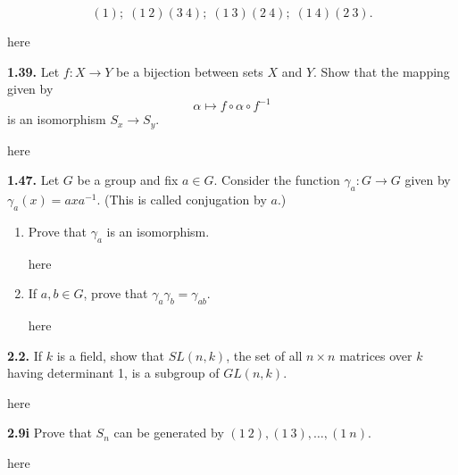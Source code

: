 \documentclass[12pt]{article}
\begin{document}
\[(1);\; (1\ 2)(3\ 4);\; (1\ 3)(2\ 4);\; (1\ 4)(2\ 3).\]


\bigskip

here

\vspace{1in}


\textbf{1.39.} Let $f : X\to Y$ be a bijection between sets $X$ and $Y$. Show that the mapping given by \[\alpha \mapsto f\circ\alpha\circ f^{-1}\] is an isomorphism $S_x\to S_y$.


\bigskip

here

\vspace{1in}

\textbf{1.47.} Let $G$ be a group and fix $a\in G$. Consider the function $\gamma_a: G\to G$ given by $\gamma_a(x)=axa^{-1}$. (This is called conjugation by $a$.)
\begin{enumerate}[(i.)]
	\item Prove that $\gamma_a$ is an isomorphism.

	\bigskip

here

\vspace{1in}

	\item If $a,b\in G$, prove that $\gamma_a\gamma_b=\gamma_{ab}$.

	\bigskip

here

\vspace{1in}
\end{enumerate}



\textbf{2.2.} If $k$ is a field, show that $SL(n,k)$, the set of all $n\times n$ matrices over $k$ having determinant 1, is a subgroup of $GL(n,k)$.

\bigskip

here

\vspace{1in}

\textbf{2.9i} Prove that $S_n$ can be generated by $(1\ 2), (1\ 3),\dotsc, (1\ n).$

\bigskip

here

\vspace{1in}
\end{document}
